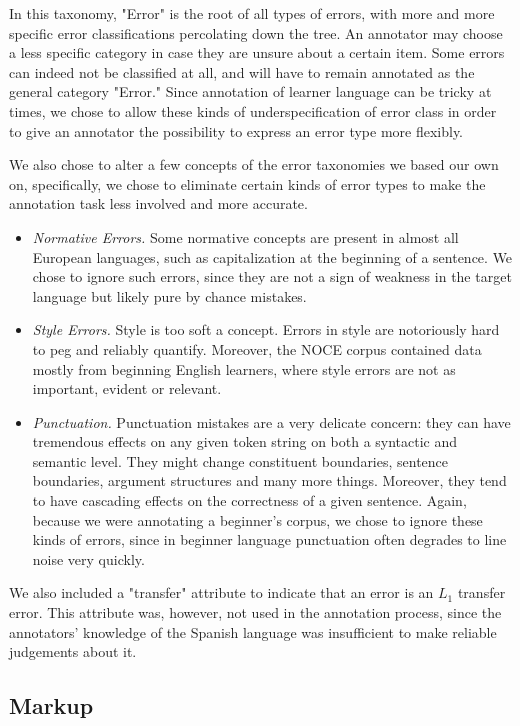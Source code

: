 \documentclass[12pt]{scrartcl}
\begin{document}
In this taxonomy, "Error" is the root of all types of errors, with more and more
specific error classifications percolating down the tree. An annotator may
choose a less specific category in case they are unsure about a certain item.
Some errors can indeed not be classified at all, and will have to remain
annotated as the general category "Error." Since annotation of learner language
can be tricky at times, we chose to allow these kinds of underspecification of
error class in order to give an annotator the possibility to express an error
type more flexibly.

We also chose to alter a few concepts of the error taxonomies we based our own
on, specifically, we chose to eliminate certain kinds of error types to make the
annotation task less involved and more accurate.

\begin{itemize}
  \item \textit{Normative Errors.} Some normative concepts are present in almost
  all European languages, such as capitalization at the beginning of a sentence.
  We chose to ignore such errors, since they are not a sign of weakness in the
  target language but likely pure by chance mistakes.
  \item \textit{Style Errors.} Style is too soft a concept. Errors in style are
  notoriously hard to peg and reliably quantify. Moreover, the NOCE corpus
  contained data mostly from beginning English learners, where style errors are
  not as important, evident or relevant.
  \item \textit{Punctuation.} Punctuation mistakes are a very delicate concern:
  they can have tremendous effects on any given token string on both a syntactic
  and semantic level. They might change constituent boundaries, sentence
  boundaries, argument structures and many more things. Moreover, they tend to
  have cascading effects on the correctness of a given sentence. Again, because
  we were annotating a beginner's corpus, we chose to ignore these kinds of
  errors, since in beginner language punctuation often degrades to line noise
  very quickly.
\end{itemize}

We also included a "transfer" attribute to indicate that an error is an $L_1$
transfer error. This attribute was, however, not used in the annotation process,
since the annotators' knowledge of the Spanish language was insufficient to
make reliable judgements about it.

\subsection{Markup}
\end{document}
